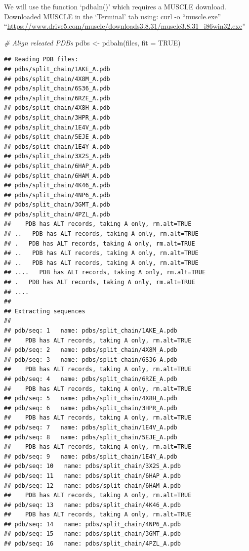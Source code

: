 \documentclass[
]{article}
\newenvironment{Shaded}{\begin{snugshade}}{\end{snugshade}}
\newcommand{\AttributeTok}[1]{\textcolor[rgb]{0.77,0.63,0.00}{#1}}
\newcommand{\CommentTok}[1]{\textcolor[rgb]{0.56,0.35,0.01}{\textit{#1}}}
\newcommand{\ConstantTok}[1]{\textcolor[rgb]{0.00,0.00,0.00}{#1}}
\newcommand{\FunctionTok}[1]{\textcolor[rgb]{0.00,0.00,0.00}{#1}}
\newcommand{\NormalTok}[1]{#1}
\newcommand{\OtherTok}[1]{\textcolor[rgb]{0.56,0.35,0.01}{#1}}
\begin{document}
We will use the function `pdbaln()' which requires a MUSCLE download.
Downloaded MUSCLE in the `Terminal' tab using: curl -o ``muscle.exe''
``\url{https://www.drive5.com/muscle/downloads3.8.31/muscle3.8.31_i86win32.exe}''

\begin{Shaded}
\begin{Highlighting}[]
\CommentTok{\# Align releated PDBs}
\NormalTok{pdbs }\OtherTok{\textless{}{-}} \FunctionTok{pdbaln}\NormalTok{(files, }\AttributeTok{fit =} \ConstantTok{TRUE}\NormalTok{)}
\end{Highlighting}
\end{Shaded}

\begin{verbatim}
## Reading PDB files:
## pdbs/split_chain/1AKE_A.pdb
## pdbs/split_chain/4X8M_A.pdb
## pdbs/split_chain/6S36_A.pdb
## pdbs/split_chain/6RZE_A.pdb
## pdbs/split_chain/4X8H_A.pdb
## pdbs/split_chain/3HPR_A.pdb
## pdbs/split_chain/1E4V_A.pdb
## pdbs/split_chain/5EJE_A.pdb
## pdbs/split_chain/1E4Y_A.pdb
## pdbs/split_chain/3X2S_A.pdb
## pdbs/split_chain/6HAP_A.pdb
## pdbs/split_chain/6HAM_A.pdb
## pdbs/split_chain/4K46_A.pdb
## pdbs/split_chain/4NP6_A.pdb
## pdbs/split_chain/3GMT_A.pdb
## pdbs/split_chain/4PZL_A.pdb
##    PDB has ALT records, taking A only, rm.alt=TRUE
## ..   PDB has ALT records, taking A only, rm.alt=TRUE
## .   PDB has ALT records, taking A only, rm.alt=TRUE
## ..   PDB has ALT records, taking A only, rm.alt=TRUE
## ..   PDB has ALT records, taking A only, rm.alt=TRUE
## ....   PDB has ALT records, taking A only, rm.alt=TRUE
## .   PDB has ALT records, taking A only, rm.alt=TRUE
## ....
## 
## Extracting sequences
## 
## pdb/seq: 1   name: pdbs/split_chain/1AKE_A.pdb 
##    PDB has ALT records, taking A only, rm.alt=TRUE
## pdb/seq: 2   name: pdbs/split_chain/4X8M_A.pdb 
## pdb/seq: 3   name: pdbs/split_chain/6S36_A.pdb 
##    PDB has ALT records, taking A only, rm.alt=TRUE
## pdb/seq: 4   name: pdbs/split_chain/6RZE_A.pdb 
##    PDB has ALT records, taking A only, rm.alt=TRUE
## pdb/seq: 5   name: pdbs/split_chain/4X8H_A.pdb 
## pdb/seq: 6   name: pdbs/split_chain/3HPR_A.pdb 
##    PDB has ALT records, taking A only, rm.alt=TRUE
## pdb/seq: 7   name: pdbs/split_chain/1E4V_A.pdb 
## pdb/seq: 8   name: pdbs/split_chain/5EJE_A.pdb 
##    PDB has ALT records, taking A only, rm.alt=TRUE
## pdb/seq: 9   name: pdbs/split_chain/1E4Y_A.pdb 
## pdb/seq: 10   name: pdbs/split_chain/3X2S_A.pdb 
## pdb/seq: 11   name: pdbs/split_chain/6HAP_A.pdb 
## pdb/seq: 12   name: pdbs/split_chain/6HAM_A.pdb 
##    PDB has ALT records, taking A only, rm.alt=TRUE
## pdb/seq: 13   name: pdbs/split_chain/4K46_A.pdb 
##    PDB has ALT records, taking A only, rm.alt=TRUE
## pdb/seq: 14   name: pdbs/split_chain/4NP6_A.pdb 
## pdb/seq: 15   name: pdbs/split_chain/3GMT_A.pdb 
## pdb/seq: 16   name: pdbs/split_chain/4PZL_A.pdb
\end{verbatim}
\end{document}
